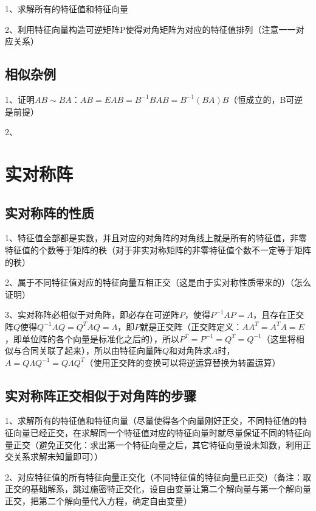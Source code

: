 1、求解所有的特征值和特征向量

2、利用特征向量构造可逆矩阵P使得对角矩阵为对应的特征值排列（注意一一对应关系）



\subsection{相似杂例}

1、证明$AB \sim BA$：$AB = EAB = B^{-1}BAB = B^{-1}(BA)B$（恒成立的，B可逆是前提）

2、

\section{实对称阵}



\subsection{实对称阵的性质}

1、特征值全部都是实数，并且对应的对角阵的对角线上就是所有的特征值，非零特征值的个数等于矩阵的秩（对于非实对称矩阵的非零特征值个数不一定等于矩阵的秩）

2、属于不同特征值对应的特征向量互相正交（这是由于实对称性质带来的）（怎么证明）

3、实对称阵必相似于对角阵，即必存在可逆阵$P$，使得$P^{-1}AP=\Lambda$，且存在正交阵$Q$使得$Q^{-1}AQ=Q^{T}AQ=\Lambda$，即$P$就是正交阵（正交阵定义：$AA^T=A^TA=E$，即单位阵的各个向量是标准化之后的），所以$P^T=P^{-1}=Q^T=Q^{-1}$（这里将相似与合同关联了起来），所以由特征向量阵$Q$和对角阵求$A$时，$A=Q\Lambda Q^{-1}=Q\Lambda Q^{T}$（使用正交阵的变换可以将逆运算替换为转置运算）



\subsection{实对称阵正交相似于对角阵的步骤}

1、求解所有的特征值和特征向量（尽量使得各个向量刚好正交，不同特征值的特征向量已经正交，在求解同一个特征值对应的特征向量时就尽量保证不同的特征向量正交（避免正交化：求出第一个特征向量之后，其它特征向量设未知数，利用正交关系求解未知量即可））

2、对应特征值的所有特征向量正交化（不同特征值的特征向量已正交）（备注：取正交的基础解系，跳过施密特正交化，设自由变量让第二个解向量与第一个解向量正交，把第二个解向量代入方程，确定自由变量）

